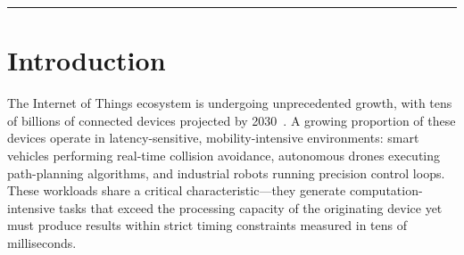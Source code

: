 \documentclass[12pt,a4paper]{article}
\begin{document}
\begin{abstract}
\noindent
The rapid proliferation of Internet of Things (IoT) devices in smart-city and
vehicular environments has created an urgent demand for low-latency, energy-efficient
computation at the network edge. Task offloading---the process of delegating
computation from resource-constrained IoT devices to fog or cloud servers---has
emerged as the central mechanism for satisfying these demands within the
three-tier IoT--Fog--Cloud hierarchy. This paper presents a structured literature
review of ten representative works spanning 2021--2025, covering five distinct
research directions: (i)~multi-objective metaheuristic optimization via NSGA-II
with Minimax Differential Evolution, (ii)~task pre-filtering through the
TOF-Broker Execution Cost framework, (iii)~software-defined networking for
programmable traffic management, (iv)~microservice-oriented DAG task modeling,
and (v)~mobility-aware offloading with deep reinforcement learning and proactive
handoff prediction. We identify the state of the art in each sub-domain, synthesize
the research trajectory, and formally define five open research gaps that no
published system has jointly resolved. Our analysis argues that the convergence of
offline Pareto optimization and online reinforcement learning---applied to DAG
workloads with GPS-driven mobility prediction---represents the most promising
direction for next-generation vehicular edge computing systems.

\end{abstract}

\vspace{0.4cm}\hrule\vspace{0.6cm}
\tableofcontents
\newpage

\section{Introduction}
\label{sec:intro}

The Internet of Things ecosystem is undergoing unprecedented growth, with tens of
billions of connected devices projected by 2030~\cite{jafari2021}. A growing
proportion of these devices operate in latency-sensitive, mobility-intensive
environments: smart vehicles performing real-time collision avoidance, autonomous
drones executing path-planning algorithms, and industrial robots running precision
control loops. These workloads share a critical characteristic---they generate
computation-intensive tasks that exceed the processing capacity of the originating
device yet must produce results within strict timing constraints measured in tens
of milliseconds.
\end{document}
